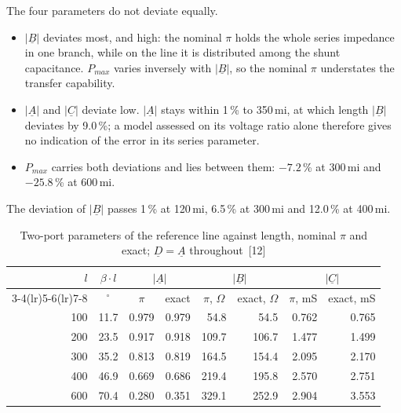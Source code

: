 The four parameters do not deviate equally.

\begin{itemize}
  \setlength{\itemsep}{0.35em}
  \item $\left|\underline{B}\right|$ deviates most, and high: the nominal
        $\pi$ holds the whole series impedance in one branch, while on the
        line it is distributed among the shunt capacitance. $P_{max}$ varies
        inversely with $\left|\underline{B}\right|$, so the nominal $\pi$
        understates the transfer capability.
  \item $\left|\underline{A}\right|$ and $\left|\underline{C}\right|$
        deviate low. $\left|\underline{A}\right|$ stays within 1\,\% to
        350\,mi, at which length $\left|\underline{B}\right|$ deviates by
        9.0\,\%; a model assessed on its voltage ratio alone therefore gives
        no indication of the error in its series parameter.
  \item $P_{max}$ carries both deviations and lies between them: $-7.2$\,\%
        at 300\,mi and $-25.8$\,\% at 600\,mi.
\end{itemize}

The deviation of $\left|\underline{B}\right|$ passes 1\,\% at 120\,mi,
6.5\,\% at 300\,mi and 12.0\,\% at 400\,mi.

\begin{table}[!ht]
  \centering
  \begin{tabular}{@{}r r r r r r r r@{}}
    \toprule
    \textbf{$l$} & \multicolumn{1}{c}{\textbf{$\beta \cdot l$}}
      & \multicolumn{2}{c}{$\left|\underline{A}\right|$}
      & \multicolumn{2}{c}{$\left|\underline{B}\right|$}
      & \multicolumn{2}{c}{$\left|\underline{C}\right|$} \\
    \cmidrule(lr){3-4}\cmidrule(lr){5-6}\cmidrule(lr){7-8}
    \multicolumn{1}{c}{mi} & \multicolumn{1}{c}{$^\circ$}
      & \multicolumn{1}{c}{$\pi$} & \multicolumn{1}{c}{exact}
      & \multicolumn{1}{c}{$\pi$, $\Omega$} & \multicolumn{1}{c}{exact, $\Omega$}
      & \multicolumn{1}{c}{$\pi$, mS} & \multicolumn{1}{c}{exact, mS} \\
    \midrule
    100 & 11.7 & 0.979 & 0.979 &  54.8 &  54.5 & 0.762 & 0.765 \\
    200 & 23.5 & 0.917 & 0.918 & 109.7 & 106.7 & 1.477 & 1.499 \\
    300 & 35.2 & 0.813 & 0.819 & 164.5 & 154.4 & 2.095 & 2.170 \\
    400 & 46.9 & 0.669 & 0.686 & 219.4 & 195.8 & 2.570 & 2.751 \\
    600 & 70.4 & 0.280 & 0.351 & 329.1 & 252.9 & 2.904 & 3.553 \\
    \bottomrule
  \end{tabular}
  \caption{Two-port parameters of the reference line against length, nominal
           $\pi$ and exact; $\underline{D} = \underline{A}$ throughout~[12]}
  \label{tab:ref-pi-abs}
\end{table}

